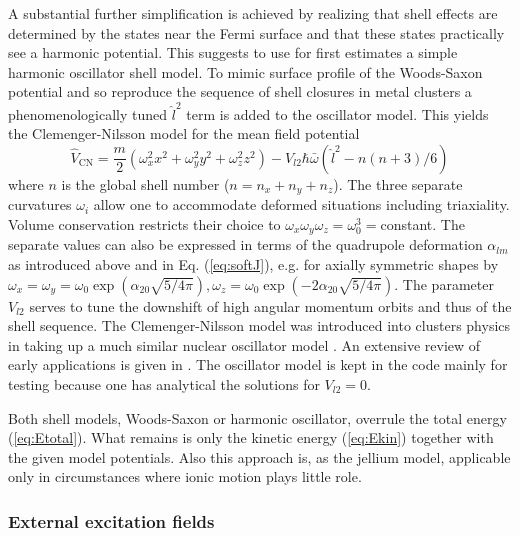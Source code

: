 \documentclass[final,1p]{elsarticle}
\begin{document}
A substantial further simplification is achieved by realizing that
shell effects are determined by the states near the Fermi surface and
that these states practically see a harmonic potential. This suggests
to use for first estimates a simple harmonic oscillator shell
model. To mimic surface profile of the Woods-Saxon potential and so
reproduce the sequence of shell closures in metal clusters
 a phenomenologically tuned $\hat{l}^2$ term is added to the
oscillator model.
This yields the Clemenger-Nilsson model for the mean field potential
\begin{equation} 
  \hat{V}_\mathrm{CN}
  =
  \frac{m}{2}\left(
  \omega_x^2x_{\mbox{}}^2+\omega_y^2y_{\mbox{}}^2+\omega_z^2z_{\mbox{}}^2
  \right)
  -
  V_{l2}\hbar\bar{\omega}\left(\hat{l}^2-n(n+3)/6\right)
\label{eq:CleNil}
\end{equation}
where $n$ is the global shell number ($n=n_x+n_y+n_z$). The three
separate curvatures $\omega_i$ allow one to accommodate deformed situations
including triaxiality. Volume conservation restricts their choice to
$\omega_x\omega_y\omega_z=\omega_0^3=$constant. The separate values
can also be expressed in terms of the quadrupole deformation
$\alpha_{lm}$ as introduced above and in Eq. (\ref{eq:softJ}),
e.g. for axially symmetric shapes by
%
$\omega_x=\omega_y=\omega_0\exp{(\alpha_{20}\sqrt{5/4\pi})},
 \omega_z=\omega_0\exp{(-2\alpha_{20}\sqrt{5/4\pi})}$.
%
The parameter $V_{l2}$ serves to tune the downshift of high angular
momentum orbits and thus of the shell sequence.
%
The Clemenger-Nilsson model was introduced into clusters physics in
\cite{Cle85} taking up a much similar nuclear oscillator model
\cite{Nil55}. An extensive review of early applications is given in
\cite{Hee93}. The oscillator model is kept in the code mainly for
testing because one has analytical the solutions for $V_{l2}=0$.

Both shell models, Woods-Saxon or harmonic oscillator, overrule the
total energy (\ref{eq:Etotal}). What remains is only the kinetic
energy (\ref{eq:Ekin}) together with the given model potentials.
Also this approach is, as the jellium model, applicable only in
circumstances where ionic motion plays little role.



\subsubsection{External excitation fields}
\label{sec:laser}
\end{document}
